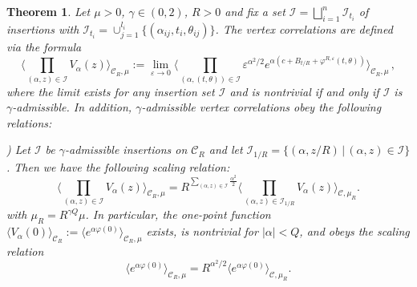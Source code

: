 \documentclass[11pt]{amsart}
\numberwithin{equation}{section}
\newtheorem{theorem}{Theorem}[section]
\theoremstyle{definition}
\newcommand{\cjd}{\rangle}
\newcommand{\cjg}{\langle}
\newcommand{\mc}{\mathcal}
\def\eps{\varepsilon}
\begin{document}
\begin{theorem} \label{thm: sinh correlations}
Let $\mu>0$, $\gamma\in (0,2)$, $R>0$ and fix a set $\mathcal{I}=\bigsqcup_{i=1}^n\mc{I}_{t_i}$ of insertions with $\mathcal{I}_{t_i}= \cup_{j=1}^{l_i} \lbrace   (\alpha_{ij},t_i, \theta_{ij}) \rbrace$. The vertex correlations are defined via the formula
\[\Big\cjg \prod_{(\alpha,z)\in \mc{I}}V_{\alpha}(z)\Big\cjd_{\mc{C}_R,\mu} :=\lim_{\eps\to 0}
\Big\langle \prod_{(\alpha, (t, \theta)) \in \mathcal{I}}\eps^{\alpha^2/2}e^{\alpha (c+ B_{t/R} +  \varphi^{R,\eps}(t,\theta)) } \Big\rangle_{\mc{C}_R,\mu}\, ,
\]
where the limit exists for any insertion set $\mathcal I$ and is nontrivial if and only if $\mathcal{I}$ is $\gamma$-admissible. In addition, $\gamma$-admissible vertex correlations obey the following relations:
\vspace{3mm}

) Let $\mathcal{I}$ be $\gamma$-admissible insertions on $\mc{C}_R$ and let $\mathcal{I}_{1/R} = \{ (\alpha, z/R) \,|\, (\alpha,z) \in \mathcal{I} \}$. Then we have the following scaling relation: 
\begin{equation}\label{scale invariance}
\Big\cjg \prod_{(\alpha,z)\in \mc{I}}V_{\alpha}(z)\Big\cjd_{\mc{C}_R,\mu} 
=
R^{\sum_{(\alpha,z) \in \mathcal{I}} \frac{\alpha^2}{2} }
\Big\cjg \prod_{(\alpha,z)\in \mc{I}_{1/R}}V_{\alpha}(z)\Big\cjd_{\mc{C},\mu_R}.
\end{equation}
with $\mu_R=R^{\gamma Q}\mu$.
 In particular, the one-point function $\langle V_\alpha(0) \rangle_{\mathcal C_R}:=\langle e^{\alpha \varphi(0)} \rangle_{\mc{C}_R,\mu}$ exists, is nontrivial for $|\alpha|<Q$, and obeys the scaling relation
\begin{equation} \label{one-pt}
\langle e^{\alpha \varphi(0)} \rangle_{\mc{C}_R,\mu}
=
R^{\alpha^2/2} \langle e^{\alpha \varphi(0)} \rangle_{\mc{C},\mu_R}.	
\end{equation}
\vspace{2mm}


\end{theorem}
\end{document}
